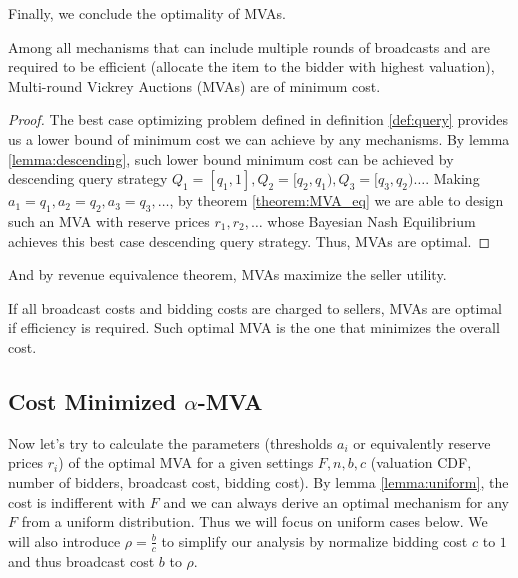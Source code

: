 Finally, we conclude the optimality of MVAs.

\begin{theorem}\label{theorem:MVA_eq}

Among all mechanisms that can include multiple rounds of broadcasts and are
required to be efficient (allocate the item to the bidder with highest
valuation), Multi-round Vickrey Auctions (MVAs) are of minimum cost.

\end{theorem}

\begin{proof}

The best case optimizing problem defined in definition \ref{def:query} provides
us a lower bound of minimum cost we can achieve by any mechanisms.  By lemma
\ref{lemma:descending}, such lower bound minimum cost can be achieved by descending query
strategy $Q_1 = [q_1, 1], Q_2 = [q_2, q_1), Q_3 = [q_3, q_2) \ldots$.  Making
$a_1 = q_1, a_2 = q_2, a_3 = q_3, \ldots$, by theorem \ref{theorem:MVA_eq} we
are able to design such an MVA with reserve prices $r_1, r_2, \ldots$  whose
Bayesian Nash Equilibrium achieves this best case descending query strategy.
Thus, MVAs are optimal.

\end{proof}

And by revenue equivalence theorem, MVAs maximize the seller utility.

\begin{corollary}

If all broadcast costs and bidding costs are charged to sellers, MVAs are
optimal if efficiency is required.  Such optimal MVA is the one that minimizes
the overall cost.

\end{corollary}

\subsection{Cost Minimized $\alpha$-MVA}

Now let's try to calculate the parameters (thresholds $a_i$ or equivalently
reserve prices $r_i$) of the optimal MVA for a given settings $F, n, b, c$
(valuation CDF, number of bidders, broadcast cost, bidding cost). By lemma
\ref{lemma:uniform}, the cost is indifferent with $F$ and we can always derive
an optimal mechanism for any $F$ from a uniform distribution. Thus we will
focus on uniform cases below. We will also introduce $\rho = \frac{b}{c}$ to
simplify our analysis by normalize bidding cost $c$ to $1$ and thus broadcast
cost $b$ to $\rho$.

